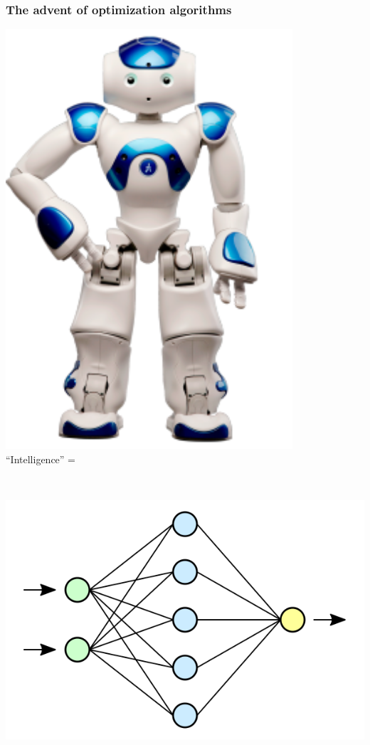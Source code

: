 \documentclass[12pt]{beamer}
\begin{document}
\iffalse
\begin{frame}
\frametitle{The advent of optimization algorithms}
\begin{minipage}[b]{0.25\textwidth}
\centering
\includegraphics[width=0.8\textwidth]{Figures/NAO.png}
\\ ``Intelligence'' =
\end{minipage} 
\hfill{\scriptsize \cite{bachoptimization}}
\\
\hfill
\begin{minipage}[b]{0.2\textwidth}
\centering
\includegraphics[width=\textwidth]{Figures/neural_network.png} \\

\end{minipage}
\end{frame}
\end{document}

